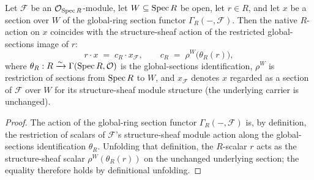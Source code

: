 \begin{lemma}\leanok
  \label{lem:modulesSpecToSheaf_smul_eq}
  Let \(\mathcal{F}\) be an \(\mathcal{O}_{\operatorname{Spec} R}\)-module, let \(W \subseteq \operatorname{Spec} R\) be open, let
  \(r \in R\), and let \(x\) be a section over \(W\) of the global-ring section functor
  \(\Gamma_R(-,\mathcal{F})\). Then the native \(R\)-action on \(x\) coincides with the structure-sheaf
  action of the restricted global-sections image of \(r\):
  \[
    r \cdot x \;=\; c_R \cdot x_{\mathcal{F}},
    \qquad
    c_R \;=\; \rho^{W}\bigl(\theta_R(r)\bigr),
  \]
  where \(\theta_R : R \xrightarrow{\sim} \Gamma(\operatorname{Spec} R, \mathcal{O})\) is the global-sections
  identification, \(\rho^{W}\) is restriction of sections from \(\operatorname{Spec} R\) to \(W\), and \(x_{\mathcal{F}}\)
  denotes \(x\) regarded as a section of \(\mathcal{F}\) over \(W\) for its structure-sheaf module
  structure (the underlying carrier is unchanged).
\end{lemma}
\begin{proof}

\leanok
  The action of the global-ring section functor \(\Gamma_R(-,\mathcal{F})\) is, by definition, the
  restriction of scalars of \(\mathcal{F}\)'s structure-sheaf module action along the global-sections
  identification \(\theta_R\). Unfolding that definition, the \(R\)-scalar \(r\) acts as the structure-sheaf
  scalar \(\rho^{W}(\theta_R(r))\) on the unchanged underlying section; the equality therefore holds by
  definitional unfolding.
\end{proof}

